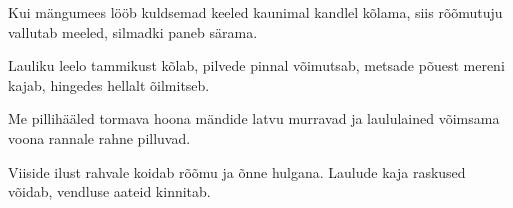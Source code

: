 Kui m\"angumees l\"o\"ob kuldsemad keeled
kaunimal kandlel k\~olama,
siis r\~o\~omutuju vallutab meeled,
silmadki paneb s\"arama.

Lauliku leelo tammikust k\~olab,
pilvede pinnal v\~oimutsab,
metsade p\~ouest mereni kajab,
hingedes hellalt \~oilmitseb.

Me pillih\"a\"aled tormava hoona
m\"andide latvu murravad
ja laululained v\~oimsama voona
rannale rahne pilluvad.

Viiside ilust rahvale koidab
r\~o\~omu ja \~onne hulgana.
Laulude kaja raskused v\~oidab,
vendluse aateid kinnitab.